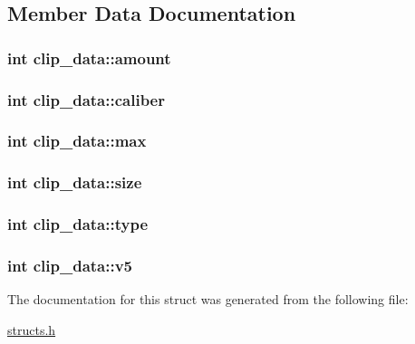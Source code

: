 \subsection{Member Data Documentation}
\hypertarget{structclip__data_a293644cd04761437ea5219aaad96b323}{
\subsubsection[{amount}]{\setlength{\rightskip}{0pt plus 5cm}int clip\-\_\-data\-::amount}}\label{structclip__data_a293644cd04761437ea5219aaad96b323}
\hypertarget{structclip__data_a2a4daf8e05d84ea4fffb8b805e32838e}{
\subsubsection[{caliber}]{\setlength{\rightskip}{0pt plus 5cm}int clip\-\_\-data\-::caliber}}\label{structclip__data_a2a4daf8e05d84ea4fffb8b805e32838e}
\hypertarget{structclip__data_a3f7387b26f105100bf16668b1e6d087d}{
\subsubsection[{max}]{\setlength{\rightskip}{0pt plus 5cm}int clip\-\_\-data\-::max}}\label{structclip__data_a3f7387b26f105100bf16668b1e6d087d}
\hypertarget{structclip__data_a6cd1820a754972b4415591114fd2f94b}{
\subsubsection[{size}]{\setlength{\rightskip}{0pt plus 5cm}int clip\-\_\-data\-::size}}\label{structclip__data_a6cd1820a754972b4415591114fd2f94b}
\hypertarget{structclip__data_a04ac29308b00699c96f6b652e45d4e2e}{
\subsubsection[{type}]{\setlength{\rightskip}{0pt plus 5cm}int clip\-\_\-data\-::type}}\label{structclip__data_a04ac29308b00699c96f6b652e45d4e2e}
\hypertarget{structclip__data_a667e11ffc4de60b5dc2fd80d501485a5}{
\subsubsection[{v5}]{\setlength{\rightskip}{0pt plus 5cm}int clip\-\_\-data\-::v5}}\label{structclip__data_a667e11ffc4de60b5dc2fd80d501485a5}


The documentation for this struct was generated from the following file\-:\begin{DoxyCompactItemize}
\item 
\hyperlink{structs_8h}{structs.\-h}\end{DoxyCompactItemize}
